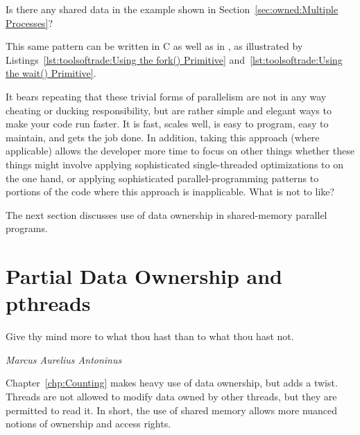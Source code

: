 \QuickQuiz{}
	Is there any shared data in the example shown in
	Section~\ref{sec:owned:Multiple Processes}?
 \QuickQuizEnd

This same pattern can be written in C as well as in , as illustrated by
Listings~\ref{lst:toolsoftrade:Using the fork() Primitive}
and~\ref{lst:toolsoftrade:Using the wait() Primitive}.

It bears repeating that these trivial forms of parallelism are not in
any way cheating or ducking responsibility, but are rather simple and
elegant ways to make your code run faster.
It is fast, scales well, is easy to program, easy to maintain, and
gets the job done.
In addition, taking this approach (where applicable) allows the developer
more time to focus on other things whether these things might involve
applying sophisticated single-threaded optimizations to 
on the one hand, or applying sophisticated parallel-programming patterns
to portions of the code where this approach is inapplicable.
What is not to like?

The next section discusses use of data ownership in shared-memory
parallel programs.

\section{Partial Data Ownership and pthreads}
\label{sec:owned:Partial Data Ownership and pthreads}
%
\epigraph{Give thy mind more to what thou hast than to what thou hast not.}
	 {\emph{Marcus Aurelius Antoninus}}

Chapter~\ref{chp:Counting} makes heavy use of data ownership,
but adds a twist.
Threads are not allowed to modify data owned by other threads,
but they are permitted to read it.
In short, the use of shared memory allows more nuanced notions
of ownership and access rights.

